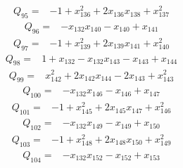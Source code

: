 \begin{equation*}\begin{split}
Q_{95}={}&-1 + x_{136}^{2} + 2x_{136} x_{138} + x_{137}^{2}
\end{split}\end{equation*}
\begin{equation*}\begin{split}
Q_{96}={}&-x_{132} x_{140} - x_{140} + x_{141}
\end{split}\end{equation*}
\begin{equation*}\begin{split}
Q_{97}={}&-1 + x_{139}^{2} + 2x_{139} x_{141} + x_{140}^{2}
\end{split}\end{equation*}
\begin{equation*}\begin{split}
Q_{98}={}&1 + x_{132} - x_{132} x_{143} - x_{143} + x_{144}
\end{split}\end{equation*}
\begin{equation*}\begin{split}
Q_{99}={}&x_{142}^{2} + 2x_{142} x_{144} - 2x_{143} + x_{143}^{2}
\end{split}\end{equation*}
\begin{equation*}\begin{split}
Q_{100}={}&-x_{132} x_{146} - x_{146} + x_{147}
\end{split}\end{equation*}
\begin{equation*}\begin{split}
Q_{101}={}&-1 + x_{145}^{2} + 2x_{145} x_{147} + x_{146}^{2}
\end{split}\end{equation*}
\begin{equation*}\begin{split}
Q_{102}={}&-x_{132} x_{149} - x_{149} + x_{150}
\end{split}\end{equation*}
\begin{equation*}\begin{split}
Q_{103}={}&-1 + x_{148}^{2} + 2x_{148} x_{150} + x_{149}^{2}
\end{split}\end{equation*}
\begin{equation*}\begin{split}
Q_{104}={}&-x_{132} x_{152} - x_{152} + x_{153}
\end{split}\end{equation*}
